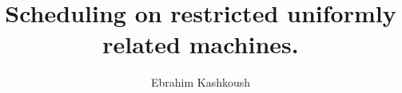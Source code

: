 \documentclass[11pt,fullpage]{article}
\begin{document}
 \newtheorem{theorem}{Theorem}[section]
 \newtheorem{corollary}{Corollary}[section]
 \newtheorem{lemma}{Lemma}[section]
 \newtheorem{exercise}{Exercise}
 \newtheorem{claim}{Claim}[section]
 \newtheorem{definition}{Definition}[section]
\def \n { \{1..n \} }
\def\proof{\noindent{\bf Proof:~}}
\def\Proof{\noindent{\bf Proof:~}}
\def\blackslug{\hbox{\hskip 1pt \vrule width 4pt height 8pt
    depth 1.5pt \hskip 1pt}}
\def\QED{\quad\blackslug\lower 8.5pt\null\par}
\def\mul {\times}
\def \lr {\longrightarrow}
\def \sr {\longrightarrow}
\def \Lr {\longleftarrow}
\def \dr {{\downarrow}}
\def \bs {\backslash }
\newcommand \nxt[1]{
             \stackrel{#1}{\lr}
}
 
\newcommand \sss[1]{
            \begin{array}[t]{l}
             #1\stackrel{\mbox{\tiny no}}{\lr}\\
             \dr
            \end{array}
}
\newcommand {\spp}[1] {
           \begin{picture}(30,30)
           \put(10,20){\sequence(1,0){20}}
           \put(10,20){\sequence(0,-1){20}}
           \put(16,22){n}
           \put(6,10){y}
           \put(0,22){#1}
           \end{picture}
         }
 

\newcommand{\utrans}[3]{
\begin{center}\tt
\renewcommand{\arraystretch}{1.4}
\begin{tabular}{|p{#3 mm}|}
\hline
\vspace*{-3ex}~\parbox{0pt}{\begin{tabbing} #1 \end{tabbing}} \\ \hline
#2 \\
\hline
\end{tabular}
\end{center}
}

%
\title{Scheduling on restricted uniformly related machines.}
\author{Ebrahim Kashkoush\\
      }

\date{}
\end{document}
